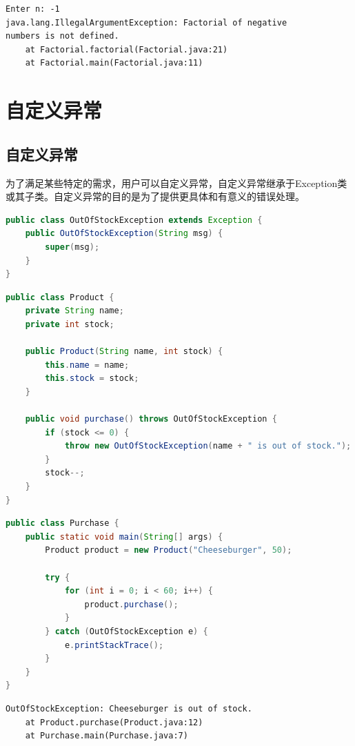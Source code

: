 \begin{tcolorbox}
    \begin{verbatim}
Enter n: -1
java.lang.IllegalArgumentException: Factorial of negative 
numbers is not defined.
    at Factorial.factorial(Factorial.java:21)
    at Factorial.main(Factorial.java:11)
	\end{verbatim}
\end{tcolorbox}

\newpage

\section{自定义异常}

\subsection{自定义异常}

为了满足某些特定的需求，用户可以自定义异常，自定义异常继承于Exception类或其子类。自定义异常的目的是为了提供更具体和有意义的错误处理。\\


\begin{lstlisting}[language=Java]
public class OutOfStockException extends Exception {
    public OutOfStockException(String msg) {
        super(msg);
    }
} 
\end{lstlisting}

\begin{lstlisting}[language=Java]
public class Product {
    private String name;
    private int stock;

    public Product(String name, int stock) {
        this.name = name;
        this.stock = stock;
    }

    public void purchase() throws OutOfStockException {
        if (stock <= 0) {
            throw new OutOfStockException(name + " is out of stock.");
        }
        stock--;
    }
}
\end{lstlisting}

\begin{lstlisting}[language=Java]
public class Purchase {
    public static void main(String[] args) {
        Product product = new Product("Cheeseburger", 50);

        try {
            for (int i = 0; i < 60; i++) {
                product.purchase();
            }
        } catch (OutOfStockException e) {
            e.printStackTrace();
        }
    }
}
\end{lstlisting}

\begin{tcolorbox}
    \begin{verbatim}
OutOfStockException: Cheeseburger is out of stock.
    at Product.purchase(Product.java:12)
    at Purchase.main(Purchase.java:7)
	\end{verbatim}
\end{tcolorbox}

\newpage